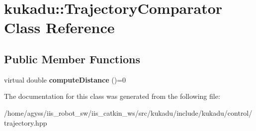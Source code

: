 \hypertarget{classkukadu_1_1TrajectoryComparator}{}\section{kukadu\+:\+:Trajectory\+Comparator Class Reference}
\label{classkukadu_1_1TrajectoryComparator}
\subsection*{Public Member Functions}
\begin{DoxyCompactItemize}
\item 
virtual double {\bfseries compute\+Distance} ()=0\hypertarget{classkukadu_1_1TrajectoryComparator_ac884f270abd402a6a121de51847424fa}{}\label{classkukadu_1_1TrajectoryComparator_ac884f270abd402a6a121de51847424fa}

\end{DoxyCompactItemize}


The documentation for this class was generated from the following file\+:\begin{DoxyCompactItemize}
\item 
/home/agyss/iis\+\_\+robot\+\_\+sw/iis\+\_\+catkin\+\_\+ws/src/kukadu/include/kukadu/control/trajectory.\+hpp\end{DoxyCompactItemize}
